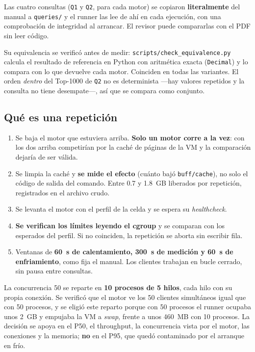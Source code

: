 Las cuatro consultas (\texttt{Q1} y \texttt{Q2}, para cada motor) se copiaron
\textbf{literalmente} del manual a \texttt{queries/} y el runner las lee de ahí en
cada ejecución, con una comprobación de integridad al arrancar. El revisor puede
compararlas con el PDF sin leer código.

Su equivalencia se verificó antes de medir: \texttt{scripts/check\_equivalence.py}
calcula el resultado de referencia en Python con aritmética exacta
(\texttt{Decimal}) y lo compara con lo que devuelve cada motor. Coinciden en todas
las variantes. El orden \emph{dentro} del Top-1000 de \texttt{Q2} no es
determinista —hay valores repetidos y la consulta no tiene desempate—, así que se
compara como conjunto.

\subsection{Qué es una repetición}

\begin{enumerate}
  \item Se baja el motor que estuviera arriba. \textbf{Solo un motor corre a la
        vez}: con los dos arriba competirían por la caché de páginas de la VM y la
        comparación dejaría de ser válida.
  \item Se limpia la caché y \textbf{se mide el efecto} (cuánto bajó
        \texttt{buff/cache}), no solo el código de salida del comando. Entre 0.7 y
        1.8~GB liberados por repetición, registrados en el archivo crudo.
  \item Se levanta el motor con el perfil de la celda y se espera su
        \emph{healthcheck}.
  \item \textbf{Se verifican los límites leyendo el cgroup} y se comparan con los
        esperados del perfil. Si no coinciden, la repetición se aborta sin
        escribir fila.
  \item Ventanas de \textbf{60~s de calentamiento, 300~s de medición y 60~s de
        enfriamiento}, como fija el manual. Los clientes trabajan en bucle cerrado,
        sin pausa entre consultas.
\end{enumerate}

La concurrencia 50 se reparte en \textbf{10 procesos de 5 hilos}, cada hilo con su
propia conexión. Se verificó que el motor ve los 50 clientes simultáneos
igual que con 50 procesos, y se eligió este reparto porque con 50 procesos el
runner ocupaba unos 2~GB y empujaba la VM a \emph{swap}, frente a unos 460~MB con
10 procesos. La decisión se apoya en el P50, el throughput, la concurrencia vista
por el motor, las conexiones y la memoria; \textbf{no} en el P95, que quedó
contaminado por el arranque en frío.

